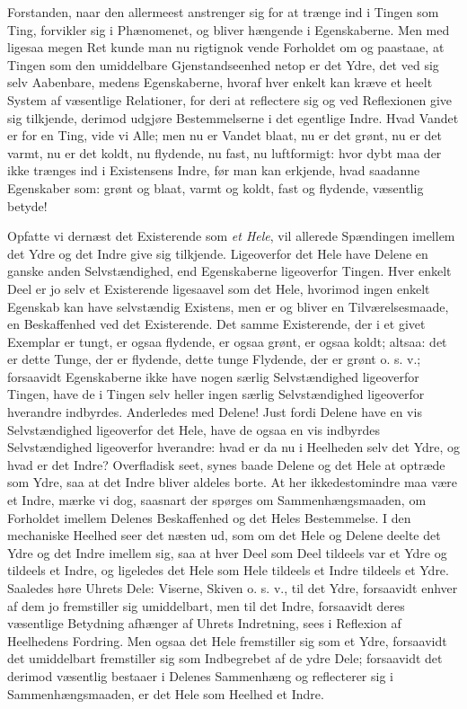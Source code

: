 \documentclass[12pt,a4paper]{book}
\begin{document}
Forstanden, naar den allermeest anstrenger sig for at trænge ind i
Tingen som Ting, forvikler sig i Phænomenet, og bliver hængende i
Egenskaberne. Men med ligesaa megen Ret kunde man nu rigtignok vende
Forholdet om og paastaae, at Tingen som den umiddelbare Gjenstandseenhed
netop er det Ydre, det ved sig selv Aabenbare, medens Egenskaberne,
hvoraf hver enkelt kan kræve et heelt System af væsentlige Relationer,
for deri at reflectere sig og ved Reflexionen give sig tilkjende,
derimod udgjøre Bestemmelserne i det egentlige Indre. Hvad Vandet er for
en Ting, vide vi Alle; men nu er Vandet blaat, nu er det grønt, nu er
det varmt, nu er det koldt, nu flydende, nu fast, nu luftformigt: hvor
dybt maa der ikke trænges ind i Existensens Indre, før man kan erkjende,
hvad saadanne Egenskaber som: grønt og blaat, varmt og koldt, fast og
flydende, væsentlig betyde!

Opfatte vi dernæst det Existerende som \emph{et Hele}, vil allerede Spændingen
imellem det Ydre og det Indre give sig tilkjende. Ligeoverfor det Hele
have Delene en ganske anden Selvstændighed, end Egenskaberne ligeoverfor
Tingen. Hver enkelt Deel er jo selv et Existerende ligesaavel som det
Hele, hvorimod ingen enkelt Egenskab kan have selvstændig Existens, men
er og bliver en Tilværelsesmaade, en Beskaffenhed ved det Existerende.
Det samme Existerende, der i et givet Exemplar er tungt, er ogsaa
flydende, er ogsaa grønt, er ogsaa
koldt; altsaa: det er dette Tunge, der er flydende, dette tunge
Flydende, der er grønt o. s. v.; forsaavidt Egenskaberne ikke have nogen
særlig Selvstændighed ligeoverfor Tingen, have de i Tingen selv heller
ingen særlig Selvstændighed ligeoverfor hverandre indbyrdes. Anderledes
med Delene! Just fordi Delene have en vis Selvstændighed ligeoverfor det
Hele, have de ogsaa en vis indbyrdes Selvstændighed ligeoverfor
hverandre: hvad er da nu i Heelheden selv det Ydre, og hvad er det
Indre? Overfladisk seet, synes baade Delene og det Hele at optræde som
Ydre, saa at det Indre bliver aldeles borte. At her ikkedestomindre maa
være et Indre, mærke vi dog, saasnart der spørges om
Sammenhængsmaaden, om Forholdet imellem Delenes Beskaffenhed og det
Heles Bestemmelse. I den mechaniske Heelhed seer det næsten ud, som om
det Hele og Delene deelte det Ydre og det Indre imellem sig, saa at hver
Deel som Deel tildeels var et Ydre og tildeels et Indre, og ligeledes
det Hele som Hele tildeels et Indre tildeels et Ydre. Saaledes høre
Uhrets Dele: Viserne, Skiven o. s. v., til det Ydre, forsaavidt enhver
af dem jo fremstiller sig umiddelbart, men til det Indre, forsaavidt
deres væsentlige Betydning afhænger af Uhrets Indretning, sees i
Reflexion af Heelhedens Fordring. Men ogsaa det Hele fremstiller sig som
et Ydre, forsaavidt det umiddelbart fremstiller sig som Indbegrebet af
de ydre Dele; forsaavidt det derimod væsentlig bestaaer i Delenes
Sammenhæng og reflecterer sig i Sammenhængsmaaden, er det Hele som
Heelhed et Indre.
\end{document}

